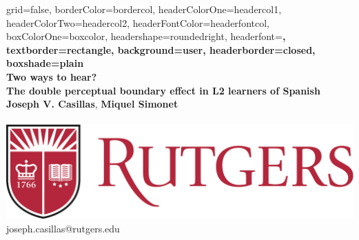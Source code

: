 \documentclass[a0paper,portrait,columns=2]{includes/tex/baposter}
\begin{document}
\begin{poster}{
  grid=false,
  borderColor=bordercol,         %
  headerColorOne=headercol1,     %
  headerColorTwo=headercol2,     %
  headerFontColor=headerfontcol, %
  boxColorOne=boxcolor,          %
  headershape=roundedright,      %
  headerfont=\Large\sf\bf,       %
  textborder=rectangle,
  background=user,
  headerborder=closed,           %
  boxshade=plain
}
{}
%
%
{
 \sf\bf 
 \phantom{.} \\ 
 \vspace{0.2in}
 \LARGE{Two ways to hear?} \\ 
 \Large{The double perceptual boundary effect in L2 learners of Spanish}
}
{
 \vspace{.6em} 
 \textbf{Joseph V. Casillas}, 
 \textbf{Miquel Simonet} \\ 
  \\
 {\vspace{-0.4in}\hspace{-7.40in}
  \includegraphics[scale=0.3]{./includes/figs/ru_shield2}\phantom{.}} \\
 {\vspace{-0.20in}\smaller joseph.casillas@rutgers.edu} \\
 {\vspace{-0.9in}\hspace{8.05in}
}}
\end{poster}
\end{document}
